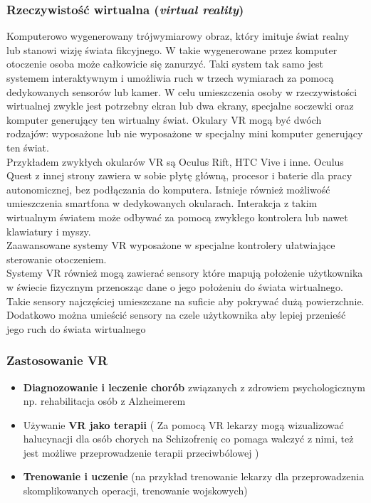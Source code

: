 \subsubsection{Rzeczywistość wirtualna (\textit{virtual reality})}

Komputerowo wygenerowany trójwymiarowy obraz,  który imituje świat realny lub stanowi wizję świata fikcyjnego. W takie wygenerowane przez  komputer otoczenie osoba może całkowicie się zanurzyć. Taki system tak samo jest systemem  interaktywnym i umożliwia ruch w trzech wymiarach za pomocą dedykowanych sensorów lub  kamer. W celu umieszczenia osoby w rzeczywistości wirtualnej zwykle jest potrzebny ekran lub  dwa ekrany, specjalne soczewki oraz komputer generujący ten wirtualny świat. Okulary VR mogą  być dwóch rodzajów: wyposażone lub nie wyposażone w specjalny mini komputer generujący ten  świat. \\

Przykładem zwykłych okularów VR są Oculus Rift, HTC Vive i inne. Oculus Quest z innej strony  zawiera w sobie płytę główną, procesor i baterie dla pracy autonomicznej, bez podłączania do  komputera. Istnieje również możliwość umieszczenia smartfona w dedykowanych okularach.  Interakcja z takim wirtualnym światem może odbywać za pomocą zwykłego kontrolera lub nawet  klawiatury i{\tiny } myszy. \\

Zaawansowane systemy VR wyposażone w specjalne kontrolery ułatwiające sterowanie  otoczeniem. \\

Systemy VR również mogą zawierać sensory które mapują położenie użytkownika w świecie  fizycznym przenosząc dane o jego położeniu do świata wirtualnego. Takie sensory najczęściej  umieszczane na suficie aby pokrywać dużą powierzchnie. Dodatkowo można umieścić sensory  na czele użytkownika aby lepiej przenieść jego ruch do świata wirtualnego 

\subsubsection{Zastosowanie VR}

\begin{itemize}
	\item \textbf{Diagnozowanie i leczenie chorób} związanych z zdrowiem psychologicznym np. rehabilitacja osób z Alzheimerem
	\item Używanie \textbf{VR jako terapii} ( Za pomocą VR lekarzy mogą wizualizować halucynacji dla osób  chorych na Schizofrenię co pomaga walczyć z nimi, też jest możliwe przeprowadzenie terapii  przeciwbólowej ) 
	\item \textbf{Trenowanie i uczenie} (na przykład trenowanie lekarzy dla przeprowadzenia skomplikowanych  operacji, trenowanie wojskowych)
\end{itemize}
